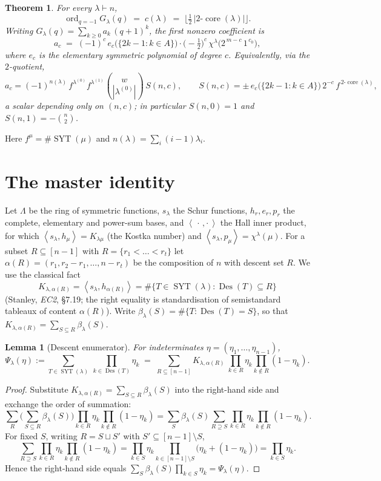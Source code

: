 \documentclass[11pt]{article}
\newtheorem{theorem}{Theorem}
\newtheorem{lemma}{Lemma}
\theoremstyle{definition}
\DeclareMathOperator{\Des}{Des}
\DeclareMathOperator{\SYT}{SYT}
\DeclareMathOperator{\ord}{ord}
\DeclareMathOperator{\core}{core}
\newcommand{\la}{\lambda}
\newcommand{\inner}[1]{\left\langle #1 \right\rangle}
\begin{document}
\begin{theorem}\label{thm:main}
For every $\la\vdash n$,
\[
  \ord_{q=-1}G_\la(q)\;=\;c(\la)\;=\;\Big\lfloor \tfrac12\,|2\text{-}\core(\la)|\Big\rfloor.
\]
Writing $G_\la(q)=\sum_{k\ge0}a_k\,(q+1)^k$, the first nonzero coefficient is
\[
  a_{c}\;=\;(-1)^{c}\,e_{c}\!\big(\{2k-1:k\in A\}\big)\cdot\Big(-\tfrac12\Big)^{c}\,
           \chi^\la\!\big(2^{\,m-c}\,1^{\,c_0}\big),
\]
where $e_c$ is the elementary symmetric polynomial of degree $c$. Equivalently, via
the $2$-quotient,
\[
  a_{c}=(-1)^{n(\la)}\,f^{\la^{(0)}}f^{\la^{(1)}}\binom{w}{|\la^{(0)}|}\,S(n,c),
  \qquad
  S(n,c)=\pm\,e_c\!\big(\{2k-1:k\in A\}\big)\,2^{-c}\,f^{\,2\text{-}\core(\la)},
\]
a scalar depending only on $(n,c)$; in particular $S(n,0)=1$ and
$S(n,1)=-\binom n2$.
\end{theorem}

Here $f^\mu=\#\SYT(\mu)$ and $n(\la)=\sum_i(i-1)\la_i$.

\section{The master identity}

Let $\Lambda$ be the ring of symmetric functions, $s_\la$ the Schur functions,
$h_r,e_r,p_r$ the complete, elementary and power-sum bases, and
$\inner{\,\cdot\,,\cdot\,}$ the Hall inner product, for which
$\inner{s_\la,h_\mu}=K_{\la\mu}$ (the Kostka number) and
$\inner{s_\la,p_\mu}=\chi^\la(\mu)$. For a subset $R\subseteq[n-1]$ with
$R=\{r_1<\dots<r_t\}$ let $\alpha(R)=(r_1,r_2-r_1,\dots,n-r_t)$ be the composition of
$n$ with descent set $R$. We use the classical fact
\begin{equation}\label{eq:kostka-des}
  K_{\la,\alpha(R)}=\inner{s_\la,h_{\alpha(R)}}=\#\{T\in\SYT(\la):\Des(T)\subseteq R\}
\end{equation}
(Stanley, \emph{EC2}, \S7.19; the right equality is standardisation of semistandard
tableaux of content $\alpha(R)$). Write $\beta_\la(S)=\#\{T:\Des(T)=S\}$, so that
$K_{\la,\alpha(R)}=\sum_{S\subseteq R}\beta_\la(S)$.

\begin{lemma}[Descent enumerator]\label{lem:descent}
For indeterminates $\eta=(\eta_1,\dots,\eta_{n-1})$,
\[
  \Psi_\la(\eta):=\sum_{T\in\SYT(\la)}\ \prod_{k\in\Des(T)}\eta_k
   \;=\;\sum_{R\subseteq[n-1]} K_{\la,\alpha(R)}\ \prod_{k\in R}\eta_k\prod_{k\notin R}(1-\eta_k).
\]
\end{lemma}

\begin{proof}
Substitute $K_{\la,\alpha(R)}=\sum_{S\subseteq R}\beta_\la(S)$ into the right-hand
side and exchange the order of summation:
\[
  \sum_{R}\Big(\sum_{S\subseteq R}\beta_\la(S)\Big)\prod_{k\in R}\eta_k\prod_{k\notin R}(1-\eta_k)
  =\sum_{S}\beta_\la(S)\sum_{R\supseteq S}\prod_{k\in R}\eta_k\prod_{k\notin R}(1-\eta_k).
\]
For fixed $S$, writing $R=S\sqcup S'$ with $S'\subseteq[n-1]\setminus S$,
\[
  \sum_{R\supseteq S}\prod_{k\in R}\eta_k\prod_{k\notin R}(1-\eta_k)
  =\prod_{k\in S}\eta_k\prod_{k\in[n-1]\setminus S}\big(\eta_k+(1-\eta_k)\big)
  =\prod_{k\in S}\eta_k .
\]
Hence the right-hand side equals $\sum_S\beta_\la(S)\prod_{k\in S}\eta_k=\Psi_\la(\eta)$.
\end{proof}
\end{document}

